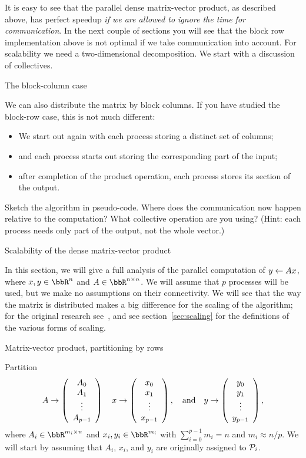 It is easy to see that the parallel dense matrix-vector product, as
described above, has perfect speedup \emph{if we are allowed to ignore
the time for communication}. In the next couple of sections you will
see that the block row implementation above is not optimal if we take
communication into account. For scalability we need a two-dimensional
decomposition. We start with a discussion of collectives.

 {The block-column case}
\label{sec:blockcol}

We can also distribute the matrix by block columns. If you have studied
the block-row case, this is not much different:
\begin{itemize}
\item We start out again with each process storing a distinct
  set of columns;
\item and each process starts out storing the corresponding
  part of the input;
\item after completion of the product operation, each process stores
  its section of the output.
\end{itemize}

\begin{exercise}
  \label{ex:dist-col-mvp}
  Sketch the algorithm in pseudo-code. Where does the communication
  now happen relative to the computation?
  What collective operation are you using?
  (Hint: each process needs only part of the output,
  not the whole vector.)
\end{exercise}

 {Scalability of the dense matrix-vector product}
\label{sec:densescaling}



In this section, we will give a full analysis of the parallel
computation of $ y \leftarrow A x $,
where $ x, y \in \Rn $ and $ A \in \Rnxn $.
We will assume that $ p $ processes will be used, but we make no
assumptions on their connectivity. We will see that the way the matrix
is distributed makes a big difference for the scaling of the
algorithm; for the original research
see~\cite{HeWo:94,Schreiber:scalability92,Stewart90}, and see
section~\ref{sec:scaling} for the definitions of the various forms of
scaling.

 {Matrix-vector product, partitioning by rows}
\label{sec:mvp-by-rows}

Partition
\[
A \rightarrow \left( \begin{array}{c} A_0 \\ A_1 \\ \vdots \\ A_{p-1} \end{array} \right) 
\quad
x \rightarrow \left( \begin{array}{c} x_0 \\ x_1 \\ \vdots \\ x_{p-1} \end{array} \right) ,
\quad
\mbox{and}
\quad
y \rightarrow \left( \begin{array}{c} y_0 \\ y_1 \\ \vdots \\ y_{p-1} \end{array} \right) ,
\]
where $ A_i \in \bbR^{m_i \times n} $ and $ x_i, y_i \in \bbR^{m_i} $ with
$ \sum_{i=0}^{p-1} m_i = n $ and $ m_i \approx n / p $.
We will start by assuming
that $ A_i $, $ x_i $, and $ y_i $ are originally assigned to $ {\cal P}_i $.

